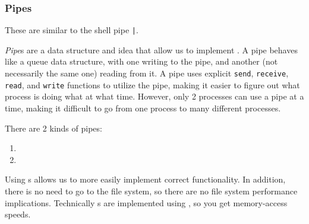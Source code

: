 \subsubsection{Pipes}\label{subsubsec:IPC_Mechanism-Pipes}
These are similar to the shell pipe \texttt{|}.

\begin{definition}[Pipe]\label{def:Pipe}
  \emph{Pipe}s are a data structure and idea that allow us to implement .
  A pipe behaves like a queue data structure, with one  writing to the pipe, and another (not necessarily the same one) reading from it.
  A pipe uses explicit \texttt{send}, \texttt{receive}, \texttt{read}, and \texttt{write} functions to utilize the pipe, making it easier to figure out what process is doing what at what time.
  However, only 2 processes can use a pipe at a time, making it difficult to go from one process to many different processes.

  There are 2 kinds of pipes:
  \begin{enumerate}[noitemsep]
  \item {}
  \item {}
  \end{enumerate}
\end{definition}

Using s allows us to more easily implement correct  functionality.
In addition, there is no need to go to the file system, so there are no file system performance implications.
Technically s are implemented using , so you get memory-access speeds.


